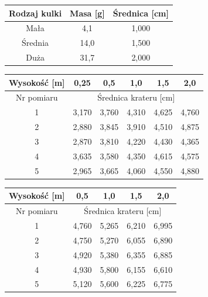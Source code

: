 \documentclass[a4paper,12pt]{article}
\begin{document}
\begin{center}
    \begin{tabular}{|c|c|c|}
        \hline
        Rodzaj kulki & Masa [g] & Średnica [cm] \\
        \hline
        Mała & 4,1 & 1,000 \\
        Średnia & 14,0 & 1,500 \\
        Duża & 31,7 & 2,000 \\
        \hline
    \end{tabular}
    \label{tab:kulki}
\end{center}

\begin{center}
    \begin{tabular}{|c|c|c|c|c|c|}
        \hline
        Wysokość [m] & 0,25 & 0,5 & 1,0 & 1,5 & 2,0 \\
        \hline
        Nr pomiaru & \multicolumn{5}{c|}{Średnica krateru [cm]} \\
        \hline
        1 & 3,170 & 3,760 & 4,310 & 4,625 & 4,760 \\
        2 & 2,880 & 3,845 & 3,910 & 4,510 & 4,875 \\
        3 & 2,870 & 3,810 & 4,220 & 4,430 & 4,365 \\
        4 & 3,635 & 3,580 & 4,350 & 4,615 & 4,575 \\
        5 & 2,965 & 3,665 & 4,060 & 4,550 & 4,880 \\
        \hline
    \end{tabular}
    \label{tab:kratery_mala}
\end{center}

\begin{center}
    \begin{tabular}{|c|c|c|c|c|}
        \hline
        Wysokość [m] & 0,5 & 1,0 & 1,5 & 2,0 \\
        \hline
        Nr pomiaru & \multicolumn{4}{c|}{Średnica krateru [cm]} \\
        \hline
        1 & 4,760 & 5,265 & 6,210 & 6,995 \\
        2 & 4,750 & 5,270 & 6,055 & 6,890 \\
        3 & 4,920 & 5,380 & 6,355 & 6,885 \\
        4 & 4,930 & 5,800 & 6,155 & 6,610 \\
        5 & 5,120 & 5,600 & 6,225 & 6,775 \\
        \hline
    \end{tabular}
    \label{tab:kratery_srednia}
\end{center}
\end{document}
